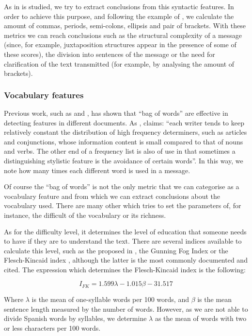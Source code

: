 As in \cite{baayen2002experiment} is studied, we try to extract conclusions from this syntactic features. In order to achieve this purpose, and following the example of \cite{calix2008stylometry}, we calculate the amount of commas, periods, semi-colons, ellipsis and pair of brackets. With these metrics we can reach conclusions such as the structural complexity of a message (since, for example, juxtaposition structures appear in the presence of some of these scores), the division into sentences of the message or the need for clarification of the text transmitted (for example, by analysing the amount of brackets).

\subsubsection{Vocabulary features}\label{sssect:vocabf}

Previous work, such as \cite{mihalcea2009lie} and \cite{ott2011finding}, has shown that ``bag of words'' are effective in detecting features in different documents. As \cite{allen1974methods}, claims: ``each writer tends to keep relatively constant the distribution of high frequency determiners, such as articles and conjunctions, whose information content is small compared to that of nouns and verbs. The other end of a frequency list is also of use in that sometimes a distinguishing stylistic feature is the avoidance of certain words''. In this way, we note how many times each different word is used in a message.

Of course the ``bag of words'' is not the only metric that we can categorise as a vocabulary feature and from which we can extract conclusions about the vocabulary used. There are many other which tries to set the parameters of, for instance, the difficult of the vocabulary or its richness.

As for the difficulty level, it determines the level of education that someone needs to have if they are to understand the text. There are several indices available to calculate this level, such as the proposed in \cite{dale1948formula}, the Gunning Fog Index \citep{wiki:gunning} or the Flesch-Kincaid index \citep{dubay2004principles}, although the latter is the most commonly documented and cited. The expression which determines the Flesch-Kincaid index is the following:

$$
I_{FK} = 1.599\lambda-1.015\beta-31.517
$$

Where $\lambda$ is the mean of one-syllable words per 100 words, and $\beta$ is the mean sentence length measured by the number of words. However, as we are not able to divide Spanish words by syllables, we determine $\lambda$ as the mean of words with two or less characters per 100 words.

